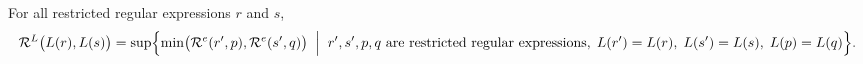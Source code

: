 
\begin{theorem}\label{thm:Rr-RL-bridge}
For all restricted regular expressions $r$ and $s$,
\[
\mathcal{R}^L\bigl(L(r),L(s)\bigr)
=
\sup\Bigl\{
\min\bigl(\mathcal{R}^e(r',p),\mathcal{R}^e(s',q)\bigr)
\;\Bigm|\;
 r',s',p,q \text{ are restricted regular expressions},\;
L(r')=L(r),\;
L(s')=L(s),\;
L(p)=L(q)
\Bigr\}.
\]
\end{theorem}
